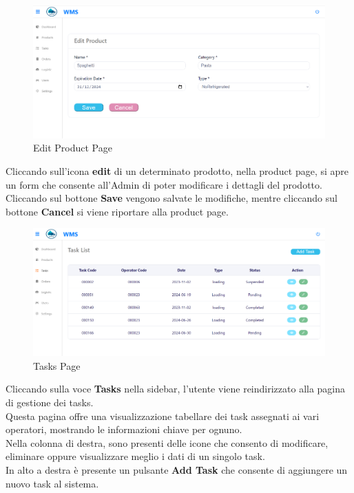 \begin{figure}[H]
    \centering
    \includegraphics[width=\textwidth]{document/sections/img/Storyboard/editProductPage.png}
    \caption{Edit Product Page}
    \label{fig:editProductPage}
\end{figure}

Cliccando sull'icona \textbf{edit} di un determinato prodotto, nella product page, si apre un form che consente
all'Admin di poter modificare i dettagli del prodotto.\\
Cliccando sul bottone \textbf{Save} vengono salvate le modifiche, mentre cliccando sul bottone \textbf{Cancel} si viene
riportare alla product page.

\begin{figure}[H]
    \centering
    \includegraphics[width=\textwidth]{document/sections/img/Storyboard/taskPage.png}
    \caption{Tasks Page}
    \label{fig:tasksPage}
\end{figure}

Cliccando sulla voce \textbf{Tasks} nella sidebar, l'utente viene reindirizzato alla pagina di gestione dei tasks.\\
Questa pagina offre una visualizzazione tabellare dei task assegnati ai vari operatori,
mostrando le informazioni chiave per ognuno.\\
Nella colonna di destra, sono presenti delle icone che consento di modificare, eliminare oppure visualizzare meglio
i dati di un singolo task.\\
In alto a destra è presente un pulsante \textbf{Add Task} che consente di aggiungere un nuovo task al sistema.

